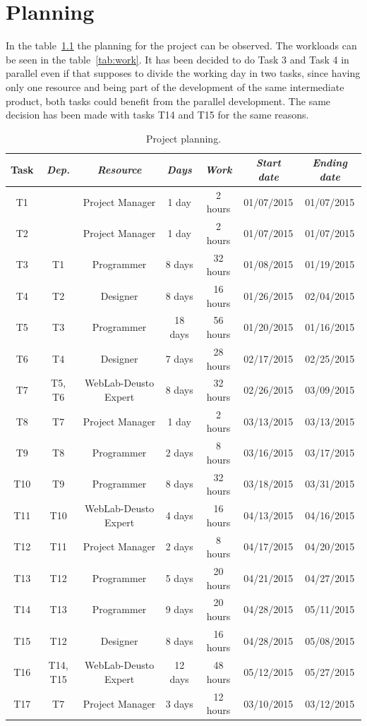 \chapter{Planning}

In the table~\ref{tab:plan} the planning for the project can be observed. The workloads can be seen
in the table~\ref{tab:work}. It has been decided to do Task 3 and Task 4 in parallel even if that
supposes to divide the working day in two tasks, since having only one resource and being part of
the development of the same intermediate product, both tasks could benefit from the parallel
development. The same decision has been made with tasks T14 and T15 for the same reasons.

\begin{table}[h]
	\centering
	\caption{Project planning.}\label{tab:plan}
	\begin{tabular}{ccccccc}
		\toprule
		\textbf{Task} & \emph{Dep.} & \emph{Resource} & \emph{Days} & \emph{Work} & \emph{Start date} & \emph{Ending date}\\
		\midrule
		T1	&				& Project Manager		& 1 day		&	2 hours		& 01/07/2015	& 01/07/2015	\\
		T2	&				& Project Manager		& 1 day		&	2 hours		& 01/07/2015	& 01/07/2015	\\
		T3	&	T1			& Programmer			& 8 days	&	32 hours	& 01/08/2015	& 01/19/2015	\\
		T4	&	T2			& Designer				& 8 days	&	16 hours	& 01/26/2015	& 02/04/2015	\\
		T5	&	T3			& Programmer			& 18 days	&	56 hours	& 01/20/2015	& 01/16/2015	\\
		T6	&	T4			& Designer				& 7 days	&	28 hours	& 02/17/2015	& 02/25/2015	\\
		T7	&	T5, T6		& WebLab-Deusto	Expert	& 8 days	&	32 hours	& 02/26/2015	& 03/09/2015	\\
		T8	&	T7			& Project Manager		& 1 day		&	2 hours		& 03/13/2015	& 03/13/2015	\\
		T9	&	T8			& Programmer			& 2 days	&	8 hours		& 03/16/2015	& 03/17/2015	\\
		T10	&	T9			& Programmer			& 8 days	&	32 hours	& 03/18/2015	& 03/31/2015	\\
		T11	&	T10			& WebLab-Deusto	Expert	& 4 days	&	16 hours	& 04/13/2015	& 04/16/2015	\\
		T12	&	T11			& Project Manager		& 2 days	&	8 hours		& 04/17/2015	& 04/20/2015	\\
		T13	&	T12			& Programmer			& 5 days	&	20 hours	& 04/21/2015	& 04/27/2015	\\
		T14	&	T13			& Programmer			& 9 days	&	20 hours	& 04/28/2015	& 05/11/2015	\\
		T15	&	T12			& Designer				& 8 days	&	16 hours	& 04/28/2015	& 05/08/2015	\\
		T16	&	T14, T15	& WebLab-Deusto	Expert	& 12 days	&	48 hours	& 05/12/2015	& 05/27/2015	\\
		T17	&	T7			& Project Manager		& 3 days	&	12 hours	& 03/10/2015	& 03/12/2015	\\
		\bottomrule
	\end{tabular}
\end{table}

